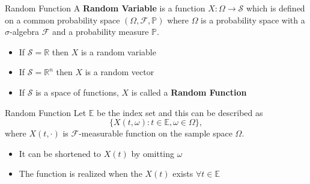 \documentclass{beamer}
\begin{document}

	\begin{frame}{Random Function}
		A \textbf{Random Variable} is a function $X : \Omega \rightarrow \mathcal{S}$ which is defined on a common probability space $(\Omega, \mathcal{F}, \mathbb{P})$ where $\Omega$ is a probability space with a $\sigma$-algebra $\mathcal{F}$ and a probability measure $\mathbb{{P}}.$
		\begin{itemize}
			\item If $\mathcal{S} = \mathbb{R}$ then $X$ is a random variable
			\item If $\mathcal{S} = \mathbb{R}^{n}$ then $X$ is a random vector
			\item If $\mathcal{S}$ is a space of functions, $X$ is called a \textbf{Random Function}
		\end{itemize}
	\end{frame}

	\begin{frame}{Random Function}
		Let $\mathbb{E}$ be the index set and this can be described as
		$${\{X(t,\omega) : t \in \mathbb{E}, \omega \in \Omega\},}$$
		where $X(t, \cdot)$ is $\mathcal{F}$-measurable function on the sample space $\Omega$.\\
		\begin{itemize}
			\item It can be shortened to $X(t)$ by omitting $\omega$
			\item The function is realized when the $X(t)$ exists $\forall t \in \mathbb{E}$
		\end{itemize}
	\end{frame}
\end{document}

